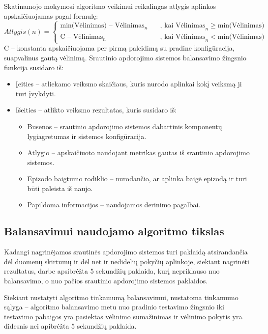 \documentclass{VUMIFPSbakalaurinis}
\begin{document}
Skatinamojo mokymosi algoritmo veikimui reikalingas atlygis aplinkos apskaičiuojamas pagal formulę:
\[ Atlygis(n) =
\begin{cases}
    \text{min(Vėlinimas) } – \text{ Vėlinimas}_n  & \quad \text{, kai Vėlinimas}_n \geq \text{min(Vėlinimas)}\\
    \text{C } – \text{ Vėlinimas}_n  & \quad \text{, kai Vėlinimas}_n < \text{min(Vėlinimas)}
\end{cases}
\]
C – konstanta apskaičiuojama per pirmą paleidimą su pradine konfigūracija, suapvalinus gautą vėlinimą. \newline
Srautinio apdorojimo sistemos balansavimo žingsnio funkcija susidaro iš:
\begin{itemize}
 \item Įeities – atliekamo veiksmo skaičiaus, kuris nurodo aplinkai kokį veiksmą ji turi įvykdyti.
 \item Išeities – atlikto veiksmo rezultatas, kuris susidaro iš:
 \begin{itemize}
    \item Būsenos – srautinio apdorojimo sistemos dabartinis komponentų lygiagretumas ir sistemos konfigūracija.
    \item Atlygio – apskaičiuoto naudojant metrikas gautas iš srautinio apdorojimo sistemos.
    \item Epizodo baigtumo rodiklio – nurodančio, ar aplinka baigė epizodą ir turi būti paleista iš naujo.
    \item Papildoma informacijos – naudojamos derinimo pagalbai.
 \end{itemize}
\end{itemize}

\subsection{Balansavimui naudojamo algoritmo tikslas}
Kadangi nagrinėjamos srautinės apdorojimo sistemos turi paklaidą atsirandančia dėl duomenų skirtumų ir dėl net ir nedidelių pokyčių aplinkoje, siekiant nagrinėti rezultatus, darbe apsibrėžta 5 sekundžių paklaida, kurį nepriklauso nuo balansavimo, o nuo pačios srautinio apdorojimo sistemos paklaidos.

Siekiant nustatyti algoritmo tinkamumą balansavimui, nustatoma tinkamumo sąlyga – algoritmo balansavimo metu nuo pradinio testavimo žingsnio iki testavimo pabaigos yra pasiektas vėlinimo sumažinimas ir vėlinimo pokytis yra didesnis nei apibrėžta 5 sekundžių paklaida. 
\end{document}
